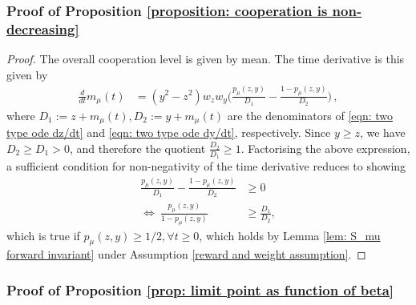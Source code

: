 \documentclass[10pt]{article}
\begin{document}
\subsubsection*{Proof of Proposition \ref{proposition: cooperation is non-decreasing}}
\begin{proof}
    The overall cooperation level is given by mean. The time derivative is this given by
    \begin{align*}
        \frac{d}{dt}m_\mu(t) &= (y^2-z^2)w_zw_y\bigg(\frac{p_\mu(z,y)}{D_1} - \frac{1-p_\mu(z,y)}{D_2}\bigg) \,,
    \end{align*}
    where $D_1:=z+m_\mu(t), D_2:=y+m_\mu(t)$ are the denominators of \eqref{eqn: two type ode dz/dt} and \eqref{eqn: two type ode dy/dt}, respectively.
    Since $y \geq z$, we have $D_2 \geq D_1> 0$, and therefore the quotient $\frac{D_2}{D_1} \geq 1$. Factorising the above expression, a sufficient condition for non-negativity of the time derivative reduces to showing
    \begin{align*}
        \frac{p_\mu(z,y)}{D_1} - \frac{1-p_\mu(z,y)}{D_2} &\geq 0\\
        \Leftrightarrow\ \frac{p_\mu(z,y)}{1-p_\mu(z,y)} &\geq \frac{D_1}{D_2},
    \end{align*}
    which is true if $p_\mu(z,y) \geq 1/2, \forall t\geq 0$, which holds by Lemma \ref{lem: S_mu forward invariant} under Assumption \ref{reward and weight assumption}. 
\end{proof}


\subsubsection*{Proof of Proposition \ref{prop: limit point as function of beta}}
\end{document}
